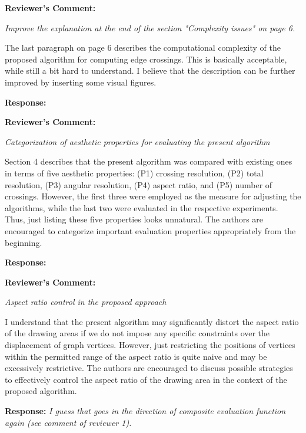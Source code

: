 \documentclass{article}
\newcommand{\tcomment}[1]{\vspace{0.3cm} {\color{red} \item \textbf{Reviewer's Comment:} {\em #1}}}
\newcommand{\jcomment}[1]{\vspace{0.3cm} {\color{blue} \item \textbf{Reviewer's Comment:} {\em #1}}}
\newcommand{\response}{\vspace{0.2cm} \textbf{Response: }}
\newcommand{\jresponse}[1]{\vspace{0.2cm} \textbf{Response: }{\color{blue} {\em #1}}}
\begin{document}
\begin{itemize}

\tcomment{Improve the explanation at the end of the section "Complexity issues" on page 6.

The last paragraph on page 6 describes the computational complexity of the proposed algorithm for computing edge crossings. This is basically acceptable, while still a bit hard to understand. I believe that the description can be further improved by inserting some visual figures.}

\response{}

\tcomment{Categorization of aesthetic properties for evaluating the present algorithm

Section 4 describes that the present algorithm was compared with existing ones in terms of five aesthetic properties: (P1) crossing resolution, (P2) total resolution, (P3) angular resolution, (P4) aspect ratio, and (P5) number of crossings. However, the first three were employed as the measure for adjusting the algorithms, while the last two were evaluated in the respective experiments. Thus, just listing these five properties looks unnatural. The authors are encouraged to categorize important evaluation properties appropriately from the beginning.}

\response{}

\jcomment{Aspect ratio control in the proposed approach

I understand that the present algorithm may significantly distort the aspect ratio of the drawing areas if we do not impose any specific constraints over the displacement of graph vertices. However, just restricting the positions of vertices within the permitted range of the aspect ratio is quite naive and may be excessively restrictive. The authors are encouraged to discuss possible strategies to effectively control the aspect ratio of the drawing area in the context of the proposed algorithm.}

\jresponse{I guess that goes in the direction of composite evaluation function again (see comment of reviewer 1).}

\end{itemize}
\end{document}
